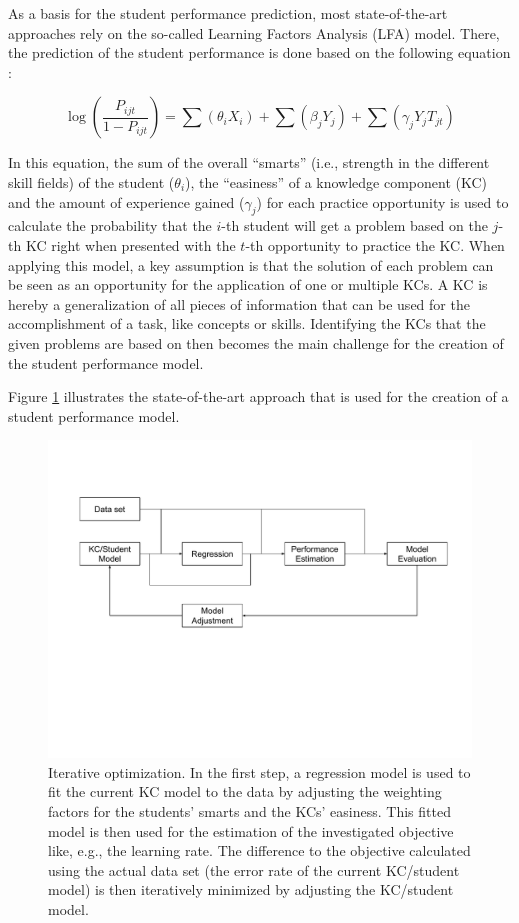 As a basis for the student performance prediction, most state-of-the-art approaches rely on the so-called Learning Factors Analysis (LFA) model. There, the prediction of the student performance is done based on the following equation \cite{equation}:

\begin{equation}
	\log (\frac{P_{ijt}}{1 - P_{ijt}}) = \sum(\theta_i X_i) + \sum(\beta_j Y_j) + \sum (\gamma_j Y_j T_{jt})
\end{equation}

In this equation, the sum of the overall “smarts” (i.e., strength in the different skill fields) of the student ($\theta_i$), the “easiness” of a knowledge component (KC) and the amount of experience gained ($\gamma_j$) for each practice opportunity is used to calculate the probability that the $i$-th student will get a problem based on the $j$-th KC right when presented with the $t$-th opportunity to practice the KC. When applying this model, a key assumption is that the solution of each problem can be seen as an opportunity for the application of one or multiple KCs. A KC is hereby a generalization of all pieces of information that can be used for the accomplishment of a task, like concepts or skills. Identifying the KCs that the given problems are based on then becomes the main challenge for the creation of the student performance model.

Figure \ref{fig_kc_opt} illustrates the state-of-the-art approach that is used for the creation of a student performance model. 


\begin{figure}
	\centering
	\includegraphics[width=\textwidth]{./img/kc_opt.pdf}
	\vspace{-3.5cm}
	\caption{Iterative optimization. In the first step, a regression model is used to fit the current KC model to the data by adjusting the weighting factors for the students’ smarts and the KCs’ easiness. This fitted model is then used for the estimation of the investigated objective like, e.g., the learning rate. The difference to the objective calculated using the actual data set (the error rate of the current KC/student model) is then iteratively minimized by adjusting the KC/student model.   
		\label{fig_kc_opt}}
\end{figure}

